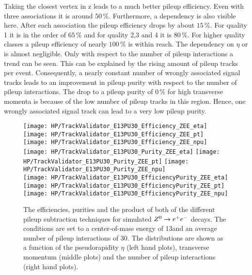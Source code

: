 Taking the closest vertex in z leads to a much better pileup efficiency. Even with three associations it is around $50\,\%$. Furthermore, a dependency is also visible here. After each association the pileup efficiency drops by about $15\,\%$. For quality 1 it is in the order of $65\,\%$ and for quality 2,3 and 4 it is $80\,\%$. For higher quality classes a pileup efficiency of nearly $100\,\%$ is within reach.  The dependency on $\eta$ or \pt{} is almost negligible. Only with respect to the number of pileup interactions a trend can be seen. This can be explained by the rising amount of pileup tracks per event. Consequently, a nearly constant number of wrongly associated signal tracks leads to an improvement in  pileup purity with respect to the number of pileup interactions. The drop to a pileup purity of $0\,\%$ for high transverse momenta is because of the low number of pileup tracks in this region. Hence, one wrongly associated signal track can lead to a very low pileup purity.

\begin{figure}[!t]
    \centering
    \texttt{[image: HP/TrackValidator\_E13PU30\_Efficiency\_ZEE\_eta]}
    \texttt{[image: HP/TrackValidator\_E13PU30\_Efficiency\_ZEE\_pt]}
    \texttt{[image: HP/TrackValidator\_E13PU30\_Efficiency\_ZEE\_npu]}
    \\
    \texttt{[image: HP/TrackValidator\_E13PU30\_Purity\_ZEE\_eta]}
    \texttt{[image: HP/TrackValidator\_E13PU30\_Purity\_ZEE\_pt]}
    \texttt{[image: HP/TrackValidator\_E13PU30\_Purity\_ZEE\_npu]}
    \\
    \texttt{[image: HP/TrackValidator\_E13PU30\_EfficiencyPurity\_ZEE\_eta]}
    \texttt{[image: HP/TrackValidator\_E13PU30\_EfficiencyPurity\_ZEE\_pt]}
    \texttt{[image: HP/TrackValidator\_E13PU30\_EfficiencyPurity\_ZEE\_npu]}
    \caption[Purities, efficiencies and their product of the different pileup subtraction techniques based on simulated $\Zz\rightarrow\EE$ decays with 13\TeV and $\left<PU\right>=30$]{The efficiencies, purities and the product of both of the different pileup subtraction techniques for simulated $\Zz\rightarrow\EE$ decays. The conditions are set to a center-of-mass energy of 13\TeV and an average number of pileup interactions of 30. The distributions are shown as a function of the pseudorapidity $\eta$ (left hand plots), transverse momentum (middle plots) and the number of pileup interactions (right hand plots). \label{plot:HPUTAE13PU30ZtoeeComp}}
\end{figure}

